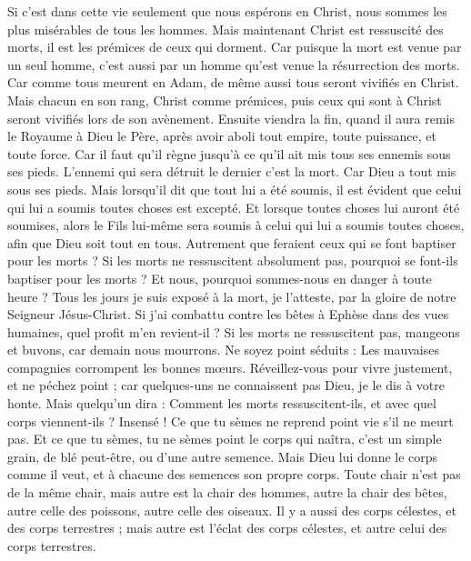\begin{multicols}{2}
Si c’est dans cette vie seulement que nous espérons en Christ, nous sommes les plus misérables de tous les hommes.
Mais maintenant Christ est ressuscité des morts, il est les prémices de ceux qui dorment.
Car puisque la mort est venue par un seul homme, c’est aussi par un homme qu’est venue la résurrection des morts.
Car comme tous meurent en Adam, de même aussi tous seront vivifiés en Christ.
Mais chacun en son rang, Christ comme prémices, puis ceux qui sont à Christ seront vivifiés lors de son avènement.
Ensuite viendra la fin, quand il aura remis le Royaume à Dieu le Père, après avoir aboli tout empire, toute puissance, et toute force.
Car il faut qu'il règne jusqu'à ce qu'il ait mis tous ses ennemis sous ses pieds.
L'ennemi qui sera détruit le dernier c'est la mort.
Car Dieu a tout mis sous ses pieds. Mais lorsqu’il dit que tout lui a été soumis, il est évident que celui qui lui a soumis toutes choses est excepté.
Et lorsque toutes choses lui auront été soumises, alors le Fils lui-même sera soumis à celui qui lui a soumis toutes choses, afin que Dieu soit tout en tous.
Autrement que feraient ceux qui se font baptiser pour les morts ? Si les morts ne ressuscitent absolument pas, pourquoi se font-ils baptiser pour les morts ?
Et nous, pourquoi sommes-nous en danger à toute heure ?
Tous les jours je suis exposé à la mort, je l’atteste, par la gloire de notre Seigneur Jésus-Christ.
Si j'ai combattu contre les bêtes à Ephèse dans des vues humaines, quel profit m’en revient-il ? Si les morts ne ressuscitent pas, mangeons et buvons, car demain nous mourrons.
Ne soyez point séduits : Les mauvaises compagnies corrompent les bonnes mœurs.
Réveillez-vous pour vivre justement, et ne péchez point ; car quelques-uns ne connaissent pas Dieu, je le dis à votre honte.
Mais quelqu'un dira : Comment les morts ressuscitent-ils, et avec quel corps viennent-ils ?
Insensé ! Ce que tu sèmes ne reprend point vie s'il ne meurt pas.
Et ce que tu sèmes, tu ne sèmes point le corps qui naîtra, c’est un simple grain, de blé peut-être, ou d’une autre semence.
Mais Dieu lui donne le corps comme il veut, et à chacune des semences son propre corps.
Toute chair n'est pas de la même chair, mais autre est la chair des hommes, autre la chair des bêtes, autre celle des poissons, autre celle des oiseaux.
Il y a aussi des corps célestes, et des corps terrestres ; mais autre est l’éclat des corps célestes, et autre celui des corps terrestres.

\end{multicols}
